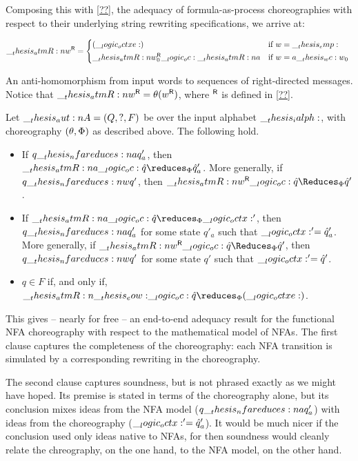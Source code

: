 Composing this with \cref{??}, the adequacy of formula-as-process choreographies with respect to their underlying string rewriting specifications, we arrive at:
%
\begin{marginfigure}
  \begin{equation*}
    \rev{\atmR{w}} =
      \begin{cases*}
        (\octxe) & if $w = \emp$ \\
        \rev{\atmR{w}_0} \oc \atmR{a} & if $w = a \wc w_0$
      \end{cases*}
  \end{equation*}
  \caption{An anti-homomorphism from input words to sequences of right-directed messages.
    Notice that $\rev{\atmR{w}} = \theta(\rev{w})$, where $\rev{}$ is defined in \cref{??}.}\label{fig:formula-as-process:msg-rev}
\end{marginfigure}%
%
\begin{corollary}\label{cor:formula-as-process:nfa-fnchor-adequacy}\leavevmode
  Let $\__thesis_aut:n {A} = (Q, ?, F)$ be  over the input alphabet $\__thesis_ialph:$, with choreography $(\theta, \Phi)$ as described above.
  The following hold.
  \begin{itemize}[nosep]
  \item
    If $q \nfareduces[a] q'_a$, then $\atmR{a} \oc \defp{q} \reduces_{\orsig} \defp{q}'_a$.
    More generally, if $q \nfareduces[w] q'$, then $\rev{\atmR{w}} \oc \defp{q} \Reduces_{\orsig} \defp{q}'$.
  \item
    If $\atmR{a} \oc \defp{q} \reduces_{\orsig} \octx'$, then $q \nfareduces[a] q'_a$ for some state $q'_a$ such that $\__logic_octx:' = \hat{q}'_a$.
    More generally, if $\rev{\atmR{w}} \oc \defp{q} \Reduces_{\orsig} \defp{q}'$, then $q \nfareduces[w] q'$ for some state $q'$ such that $\__logic_octx:' = \hat{q}'$.
  \item
    $q \in F$ if, and only if, $\atmR{\eow} \oc \defp{q} \reduces_{\orsig} (\octxe)$.
  \end{itemize}
\end{corollary}

This  gives -- nearly for free -- an end-to-end adequacy result for the functional \ac{NFA} choreography with respect to the mathematical model of \acp{NFA}.
The first clause captures the completeness of the choreography: each \ac{NFA} transition is simulated by a corresponding rewriting in the choreography.

The second clause captures soundness, but is not phrased exactly as we might have hoped.
Its premise is stated in terms of the choreography alone, but its conclusion mixes ideas from the \ac{NFA} model ($q \nfareduces[a] q'_a$) with ideas from the choreography ($\__logic_octx:' = \hat{q}'_a$).
It would be much nicer if the conclusion used only ideas native to \acp{NFA}, for then soundness would cleanly relate the chreography, on the one hand, to the \ac{NFA} model, on the other hand.



